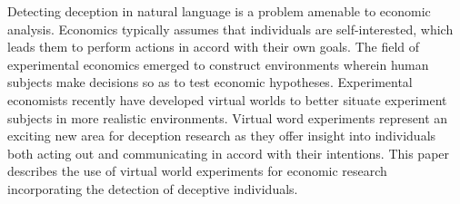 Detecting deception in natural language is a problem amenable to economic analysis. Economics typically assumes that individuals are self-interested, which leads them to perform actions in accord with their own goals. The field of experimental economics emerged to construct environments wherein human subjects make decisions so as to test economic hypotheses. Experimental economists recently have developed virtual worlds to better situate experiment subjects in more realistic environments. Virtual word experiments represent an exciting new area for deception research as they offer insight into individuals both acting out and communicating in accord with their intentions. This paper describes the use of virtual world experiments for economic research incorporating the detection of deceptive individuals.
